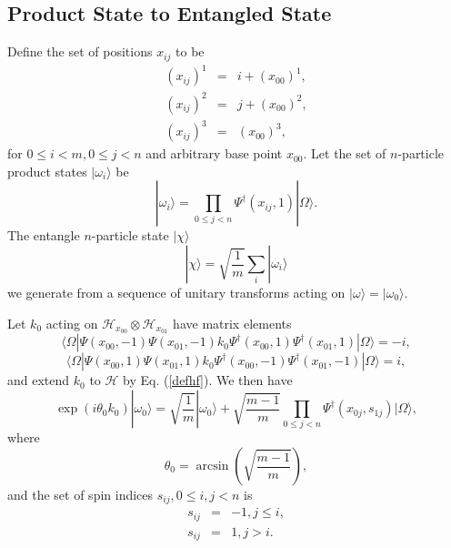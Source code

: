 \documentclass[12pt,amsmath,amssymb,onecolumn]{revtex4-2}
\begin{document}
\subsection{\label{app:subsecfirst}Product State to Entangled State}

Define the set of positions $x_{ij}$ to be
\begin{subequations}
\begin{eqnarray}
\label{defxij0}
(x_{ij})^1 & = & i + (x_{00})^1 ,\\
\label{defxij1}
(x_{ij})^2 & = & j + (x_{00})^2,\\
\label{defxij2}
(x_{ij})^3 & = & (x_{00})^3,
\end{eqnarray}
\end{subequations}
for $0 \le i < m, 0 \le j < n$ and arbitrary base point $x_{00}$.
Let the set of $n$-particle product states $|\omega_i \rangle $ be
\begin{equation}
\label{defomega}
|\omega_i \rangle   =  \prod_{0 \le j < n} \Psi^\dagger( x_{ij}, 1) |\Omega \rangle .
\end{equation}
The entangle $n$-particle state $|\chi \rangle $
\begin{equation}
\label{defchi}
|\chi \rangle  = \sqrt{\frac{1}{m}} \sum_i |\omega_i \rangle 
\end{equation}
we generate from a sequence of unitary transforms acting
on $|\omega \rangle  = |\omega_0 \rangle $.



Let $k_{0}$ acting on $\mathcal{H}_{x_{00}} \otimes \mathcal{H}_{x_{01}}$
have matrix elements
\begin{equation}
\label{defk01}
 \langle  \Omega| \Psi( x_{00}, -1) \Psi( x_{01}, -1) k_0 
\Psi^{\dagger}(x_{00},1) \Psi^{\dagger}( x_{01},1)|\Omega \rangle  = -i,
\end{equation}
\begin{equation}
\label{defk10}
 \langle  \Omega| \Psi(x_{00},1) \Psi( x_{01}, 1) k_0 
 \Psi^{\dagger}(x_{00},-1) \Psi^{\dagger}( x_{01},-1)|\Omega \rangle  = i,
\end{equation}
and extend $k_0$ to $\mathcal{H}$ by Eq. (\ref{defhf}). 
We then have
\begin{equation}
\label{k00}
\exp( i \theta_0 k_0) |\omega_0 \rangle  = 
\sqrt{\frac{1}{m}} |\omega_0 \rangle  + 
\sqrt{\frac{m - 1}{m}} \prod_{0 \le j < n} \Psi^{\dagger}( x_{0j}, s_{1j}) |\Omega \rangle ,
\end{equation}
where
\begin{equation}
\label{defarcsin}
\theta_0 = \arcsin( \sqrt{\frac{m - 1}{m}}),
\end{equation}
and the set of spin indices $s_{ij}, 0 \le i,j < n$ is
\begin{subequations}
\begin{eqnarray}
\label{defsj0}
s_{ij} & = & -1, j \le i, \\
\label{defsj1}
s_{ij} & = & 1, j  >  i.
\end{eqnarray}
\end{subequations}
\end{document}
